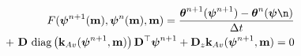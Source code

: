 \begin{align}
\label{eq:richards-timestep}
F(\boldsymbol{\psi}^{n+1}(\mathbf{m}),\boldsymbol{\psi}^n(\mathbf{m}),\mathbf{m}) =
\frac{\boldsymbol{\theta}^{n+1}(\boldsymbol{\psi}^{n+1}) - \boldsymbol{\theta}^n(\boldsymbol{\psi}\n)}{\Delta t}
\nonumber\\+
\ \mathbf{D}
    \text{ diag}\left(\mathbf{k}_{Av}(\boldsymbol{\psi}^{n+1},\mathbf{m})\right)
    \mathbf{D}^{\top} \boldsymbol{\psi}^{n+1}
+
\mathbf{D}_{z} \mathbf{k}_{Av}(\boldsymbol{\psi}^{n+1},\mathbf{m})
= 0
\end{align}
